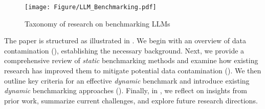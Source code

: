 \begin{figure*}
    \centering
    \texttt{[image: Figure/LLM\_Benchmarking.pdf]}
    \caption{ Taxonomy of research on benchmarking LLMs}
    \label{fig:Taxonomy}
\end{figure*}


The paper is structured as illustrated in . We begin with an overview of data contamination (), establishing the necessary background. Next, we provide a comprehensive review of \textit{static} benchmarking methods and examine how existing research has improved them to mitigate potential data contamination (). We then outline key criteria for an effective \textit{dynamic} benchmark and introduce existing \textit{dynamic} benchmarking approaches (). Finally, in , we reflect on insights from prior work, summarize current challenges, and explore future research directions.

